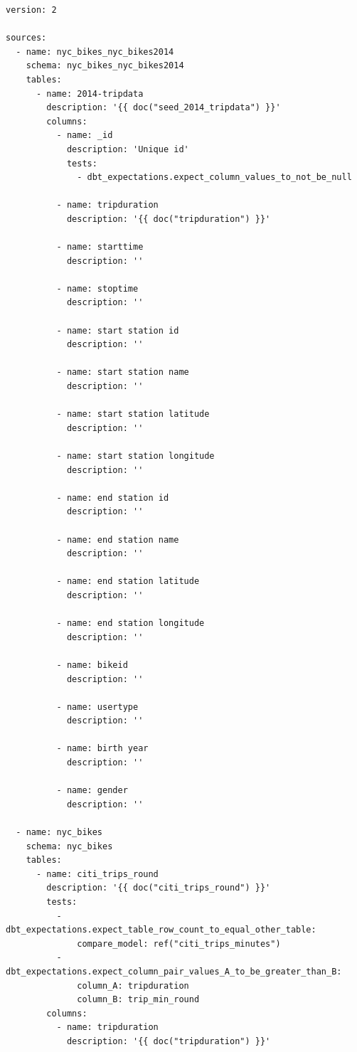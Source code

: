 \documentclass[
]{book}
\begin{document}
\begin{verbatim}
version: 2

sources:
  - name: nyc_bikes_nyc_bikes2014
    schema: nyc_bikes_nyc_bikes2014
    tables:
      - name: 2014-tripdata
        description: '{{ doc("seed_2014_tripdata") }}'
        columns:
          - name: _id 
            description: 'Unique id'
            tests:
              - dbt_expectations.expect_column_values_to_not_be_null

          - name: tripduration 
            description: '{{ doc("tripduration") }}'

          - name: starttime 
            description: ''

          - name: stoptime 
            description: ''

          - name: start station id 
            description: ''

          - name: start station name
            description: ''

          - name: start station latitude
            description: ''

          - name: start station longitude
            description: ''

          - name: end station id
            description: ''

          - name: end station name
            description: ''

          - name: end station latitude
            description: ''

          - name: end station longitude
            description: ''

          - name: bikeid
            description: ''

          - name: usertype
            description: ''

          - name: birth year
            description: ''

          - name: gender
            description: ''

  - name: nyc_bikes
    schema: nyc_bikes 
    tables:
      - name: citi_trips_round
        description: '{{ doc("citi_trips_round") }}'
        tests:
          - dbt_expectations.expect_table_row_count_to_equal_other_table:
              compare_model: ref("citi_trips_minutes")
          - dbt_expectations.expect_column_pair_values_A_to_be_greater_than_B:
              column_A: tripduration
              column_B: trip_min_round
        columns:
          - name: tripduration
            description: '{{ doc("tripduration") }}'


\end{verbatim}
\end{document}
